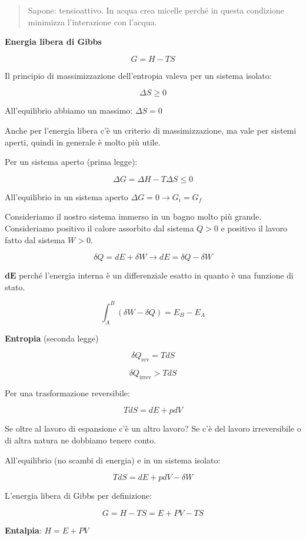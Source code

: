 \begin{quote}
Sapone: tensioattivo. In acqua crea micelle perché in questa condizione
minimizza l'interazione con l'acqua.
\end{quote}

\textbf{Energia libera di Gibbs}

\[G = H - TS\]

Il principio di massimizzazione dell'entropia valeva per un sistema
isolato:

\[\Delta S \geq 0\]

All'equilibrio abbiamo un massimo: \(\Delta S = 0\)

Anche per l'energia libera c'è un criterio di massimizzazione, ma vale
per sistemi aperti, quindi in generale è molto più utile.

Per un sistema aperto (prima legge):

\[\Delta G = \Delta H - T\Delta S \leq 0\]

All'equilibrio in un sistema aperto
\(\Delta G = 0 \rightarrow G_{i} = G_{f}\)

Consideriamo il nostro sistema immerso in un bagno molto più grande.
Consideriamo positivo il calore assorbito dal sistema \(Q > 0\) e
positivo il lavoro fatto dal sistema \(W > 0\).

\[\delta Q = dE + \delta W \rightarrow dE = \delta Q - \delta W\]

\(\mathbf{\text{dE}}\) perché l'energia interna è un differenziale
esatto in quanto è una funzione di stato.

\[\int_{A}^{B}{(\delta W - \delta Q)} = E_{B} - E_{A}\]

\textbf{Entropia} (seconda legge)

\[\delta Q_{\text{rev}} = TdS\]

\[\delta Q_{\text{irrev}} > TdS\]

Per una trasformazione reversibile:

\[TdS = dE + pdV\]

Se oltre al lavoro di espansione c'è un altro lavoro? Se c'è del lavoro
irreversibile o di altra natura ne dobbiamo tenere conto.

All'equilibrio (no scambi di energia) e in un sistema isolato:

\[TdS = dE + pdV - \delta W\]

L'energia libera di Gibbs per definizione:

\[G = H - TS = E + PV - TS\]

\textbf{Entalpia}: \(H = E + PV\)

